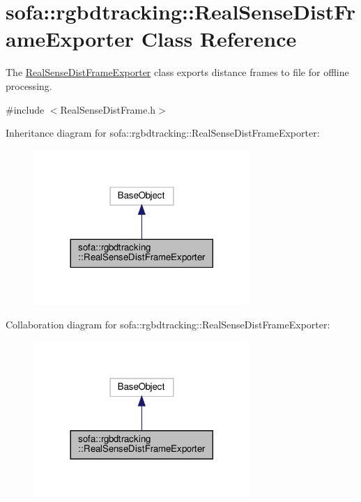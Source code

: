 \hypertarget{classsofa_1_1rgbdtracking_1_1_real_sense_dist_frame_exporter}{}\section{sofa\+:\+:rgbdtracking\+:\+:Real\+Sense\+Dist\+Frame\+Exporter Class Reference}
\label{classsofa_1_1rgbdtracking_1_1_real_sense_dist_frame_exporter}


The \hyperlink{classsofa_1_1rgbdtracking_1_1_real_sense_dist_frame_exporter}{Real\+Sense\+Dist\+Frame\+Exporter} class exports distance frames to file for offline processing.  




{\ttfamily \#include $<$Real\+Sense\+Dist\+Frame.\+h$>$}



Inheritance diagram for sofa\+:\+:rgbdtracking\+:\+:Real\+Sense\+Dist\+Frame\+Exporter\+:
\nopagebreak
\begin{figure}[H]
\begin{center}
\leavevmode
\includegraphics[width=233pt]{classsofa_1_1rgbdtracking_1_1_real_sense_dist_frame_exporter__inherit__graph}
\end{center}
\end{figure}


Collaboration diagram for sofa\+:\+:rgbdtracking\+:\+:Real\+Sense\+Dist\+Frame\+Exporter\+:
\nopagebreak
\begin{figure}[H]
\begin{center}
\leavevmode
\includegraphics[width=233pt]{classsofa_1_1rgbdtracking_1_1_real_sense_dist_frame_exporter__coll__graph}
\end{center}
\end{figure}
